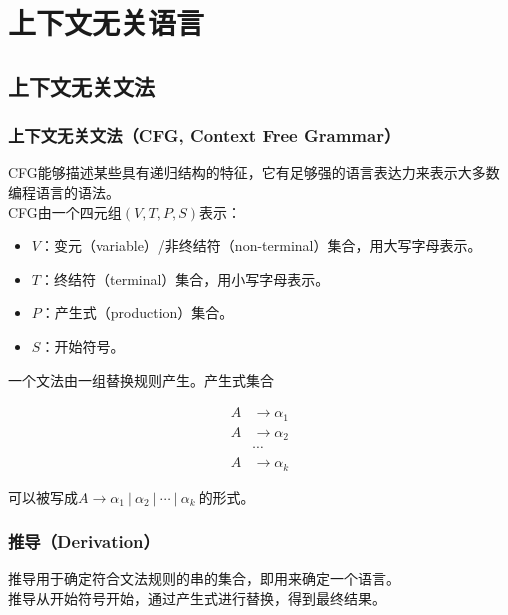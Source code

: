\chapter{上下文无关语言}

\section{上下文无关文法}

\subsection{上下文无关文法（CFG, Context Free Grammar）}

CFG能够描述某些具有递归结构的特征，它有足够强的语言表达力来表示大多数编程语言的语法。\\

CFG由一个四元组$ (V, T, P, S) $表示：

\begin{itemize}
    \item $ V $：变元（variable）/非终结符（non-terminal）集合，用大写字母表示。
    \item $ T $：终结符（terminal）集合，用小写字母表示。
    \item $ P $：产生式（production）集合。
    \item $ S $：开始符号。
\end{itemize}

一个文法由一组替换规则产生。产生式集合

\vspace{-1cm}

\begin{align*}
    A & \rightarrow \alpha_1 \\
    A & \rightarrow \alpha_2 \\
      & \cdots               \\
    A & \rightarrow \alpha_k
\end{align*}

可以被写成$ A \rightarrow \alpha_1\ |\ \alpha_2\ |\ \cdots\ |\ \alpha_k\ $的形式。\\

\subsection{推导（Derivation）}

推导用于确定符合文法规则的串的集合，即用来确定一个语言。\\

推导从开始符号开始，通过产生式进行替换，得到最终结果。\\

